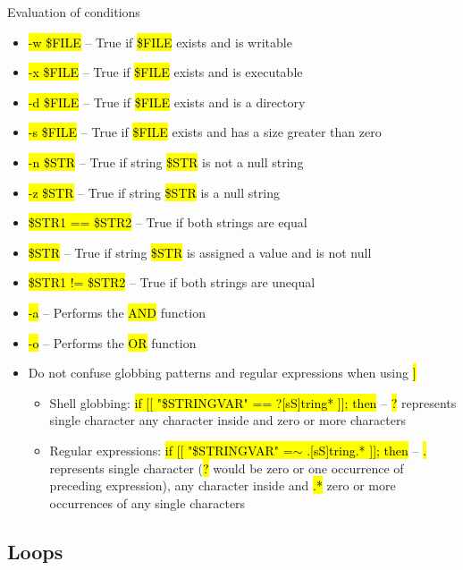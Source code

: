 \documentclass[compress, ucs, xelatex, 11pt, xcolor=svgnames,
  hyperref={
    bookmarks=true,
    unicode=true,
    colorlinks=true,
    pdftitle={Linux, command line and MetaCentrum},
    plainpages=false,
    pdfauthor={Vojtech Zeisek},
    pdfsubject={Course about use of Linux command line, writing shell scripts and using MetaCentrum of CESNET},
    pdfcreator={XeLaTeX},
    pdfkeywords={Linux, GNU, BASH, shell, command line, MetaCentrum},
    linkcolor=Red,
    anchorcolor=Blue,
    citecolor=Purple,
    filecolor=DodgerBlue,
    menucolor=DarkOrchid,
    urlcolor=DeepSkyBlue,
    pdftex},
  url={hyphens, lowtilde} %
  ]{beamer}
\renewcommand{\texttt}[1]{\hl{\ttfamily #1}}
\begin{document}
\begin{frame}[allowframebreaks]{Evaluation of conditions}
\begin{itemize}
  \item \texttt{-w \$FILE} -- True if \texttt{\$FILE} exists and is writable
  \item \texttt{-x \$FILE} -- True if \texttt{\$FILE} exists and is executable
  \item \texttt{-d \$FILE} -- True if \texttt{\$FILE} exists and is a directory
  \item \texttt{-s \$FILE} -- True if \texttt{\$FILE} exists and has a size greater than zero
  \item \texttt{-n \$STR} -- True if string \texttt{\$STR} is not a null string
  \item \texttt{-z \$STR} -- True if string \texttt{\$STR} is a null string
  \item \texttt{\$STR1 == \$STR2} -- True if both strings are equal
  \item \texttt{\$STR} -- True if string \texttt{\$STR} is assigned a value and is not null
  \item \texttt{\$STR1 != \$STR2} -- True if both strings are unequal
  \item \texttt{-a} -- Performs the \texttt{AND} function
  \item \texttt{-o} -- Performs the \texttt{OR} function
  \item Do not confuse globbing patterns and regular expressions when using \texttt{[[ \ldots~]]}
  \begin{itemize}
    \item Shell globbing: \texttt{if [[ "\$STRINGVAR" == ?[sS]tring* ]]; then} -- \texttt{?} represents single character \texttt{[]} any character inside and \texttt{*} zero or more characters
    \item Regular expressions: \texttt{if [[ "\$STRINGVAR" =$\sim$ .[sS]tring.* ]]; then} -- \texttt{.} represents single character (\texttt{?} would be zero or one occurrence of preceding expression), \texttt{[]} any character inside and \texttt{.*} zero or more occurrences of any single characters
  \end{itemize}
\end{itemize}
\end{frame}

\subsection{Loops}
\end{document}
